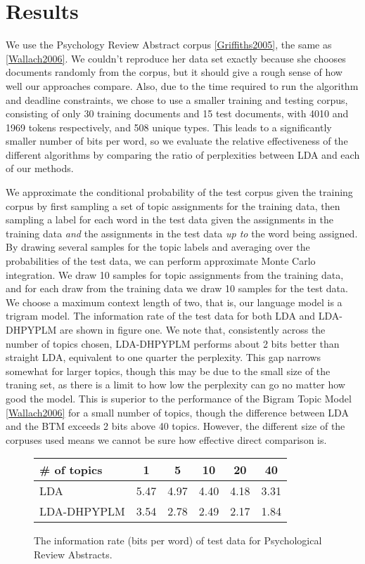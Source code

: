 \section{Results}

We use the Psychology Review Abstract corpus \ref{Griffiths2005}, the same as \ref{Wallach2006}.  We couldn't reproduce her data set exactly because she chooses documents randomly from the corpus, but it should give a rough sense of how well our approaches compare.  Also, due to the time required to run the algorithm and deadline constraints, we chose to use a smaller training and testing corpus, consisting of only 30 training documents and 15 test documents, with 4010 and 1969 tokens respectively, and 508 unique types.  This leads to a significantly smaller number of bits per word, so we evaluate the relative effectiveness of the different algorithms by comparing the ratio of perplexities between LDA and each of our methods.

We approximate the conditional probability of the test corpus given the training corpus by first sampling a set of topic assignments for the training data, then sampling a label for each word in the test data given the assignments in the training data \textit{and} the assignments in the test data \textit{up to} the word being assigned.  By drawing several samples for the topic labels and averaging over the probabilities of the test data, we can perform approximate Monte Carlo integration.  We draw 10 samples for topic assignments from the training data, and for each draw from the training data we draw 10 samples for the test data.  We choose a maximum context length of two, that is, our language model is a trigram model.  The information rate of the test data for both LDA and LDA-DHPYPLM are shown in figure one.  We note that, consistently across the number of topics chosen, LDA-DHPYPLM performs about 2 bits better than straight LDA, equivalent to one quarter the perplexity.  This gap narrows somewhat for larger topics, though this may be due to the small size of the traning set, as there is a limit to how low the perplexity can go no matter how good the model.  This is superior to the performance of the Bigram Topic Model \ref{Wallach2006} for a small number of topics, though the difference between LDA and the BTM exceeds 2 bits above 40 topics.  However, the different size of the corpuses used means we cannot be sure how effective direct comparison is.

\begin{figure}
\begin{center}
\begin{tabular}{| l || c | c | c | c | c |}
\hline
\# of topics & 1 & 5 & 10 & 20 & 40 \\
\hline
LDA & 5.47 & 4.97 & 4.40 & 4.18 & 3.31\\
\hline
LDA-DHPYPLM & 3.54 & 2.78 & 2.49 & 2.17 & 1.84\\
\hline
\end{tabular}
\caption{The information rate (bits per word) of test data for Psychological Review Abstracts.}
\end{center}
\end{figure}

